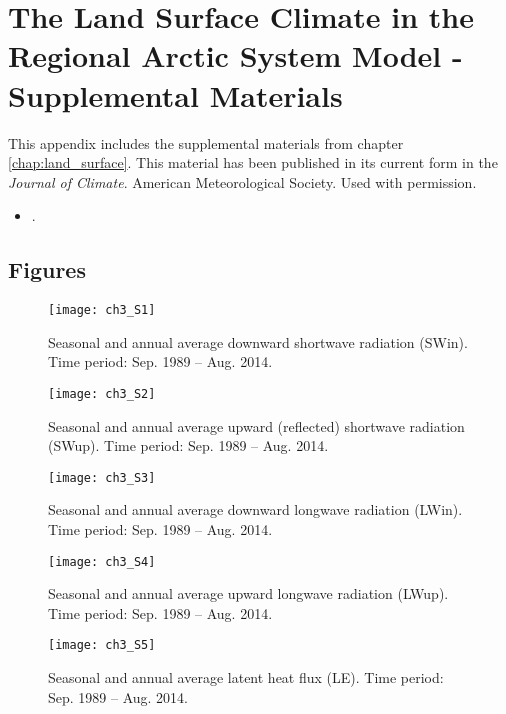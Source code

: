 \chapter{The Land Surface Climate in the Regional Arctic System Model - Supplemental Materials}
\label{chap:land_surface_sup}

This appendix includes the supplemental materials from chapter \ref{chap:land_surface}.
This material has been published in its current form in the \textit{Journal of Climate}.
\textcopyright American Meteorological Society.
Used with permission.
\begin{itemize}
    \item {}.
\end{itemize}

\section{Figures}

\begin{figure}
    \centering
    \texttt{[image: ch3\_S1]}
    \caption{Seasonal and annual average downward shortwave radiation (SWin).
    Time period: Sep. 1989 – Aug. 2014.}
\end{figure}

\begin{figure}
    \centering
    \texttt{[image: ch3\_S2]}
    \caption{Seasonal and annual average upward (reflected) shortwave radiation (SWup).
    Time period: Sep. 1989 – Aug. 2014.}
\end{figure}

\begin{figure}
    \centering
    \texttt{[image: ch3\_S3]}
    \caption{Seasonal and annual average downward longwave radiation (LWin).
    Time period: Sep. 1989 – Aug. 2014.}
\end{figure}

\begin{figure}
    \centering
    \texttt{[image: ch3\_S4]}
    \caption{Seasonal and annual average upward longwave radiation (LWup).
    Time period: Sep. 1989 – Aug. 2014.}
\end{figure}

\begin{figure}
    \centering
    \texttt{[image: ch3\_S5]}
    \caption{Seasonal and annual average latent heat flux (LE).
    Time period: Sep. 1989 – Aug. 2014.}
\end{figure}

